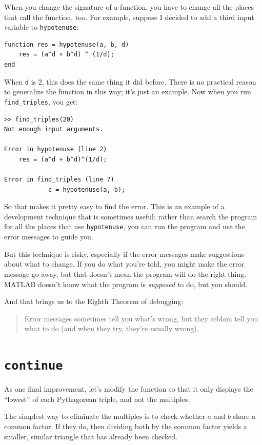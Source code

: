 \documentclass{book}
\begin{document}
When you change the signature of a function, you have to change all
the places that call the function, too.  For example, suppose
I decided to add a third input variable to {\tt hypotenuse}:

\begin{verbatim}
function res = hypotenuse(a, b, d)
    res = (a^d + b^d) ^ (1/d);
end
\end{verbatim}

When {\tt d} is 2, this does the same thing it did before.  There is
no practical reason to generalize the function in this way; it's just
an example.  Now when you run {\tt find\_triples}, you get:

\begin{verbatim}
>> find_triples(20)
Not enough input arguments.

Error in hypotenuse (line 2)
    res = (a^d + b^d)^(1/d);

Error in find_triples (line 7)
            c = hypotenuse(a, b);
\end{verbatim}

So that makes it pretty easy to find the error.  This is an example of
a development technique that is sometimes useful: rather
than search the program for all the places that use {\tt hypotenuse},
you can run the program and use the error messages to guide you.

But this technique is risky, especially if the error messages make
suggestions about what to change.  If you do what you're told, you
might make the error message go away, but that doesn't mean the
program will do the right thing.  MATLAB doesn't know what the program
is {\em supposed} to do, but you should.

And that brings us to the Eighth Theorem of debugging:

\begin{quote}
Error messages sometimes tell you what's wrong, but they
seldom tell you what to do (and when they try, they're usually
wrong).
\end{quote}


\section{{\tt continue}}

As one final improvement, let's modify the function so that it only
displays the ``lowest'' of each Pythagorean triple, and not the
multiples.

The simplest way to eliminate the multiples is to check whether
$a$ and $b$ share a common factor.  If they do, then dividing both
by the common factor yields a smaller, similar triangle that has
already been checked.
\end{document}
